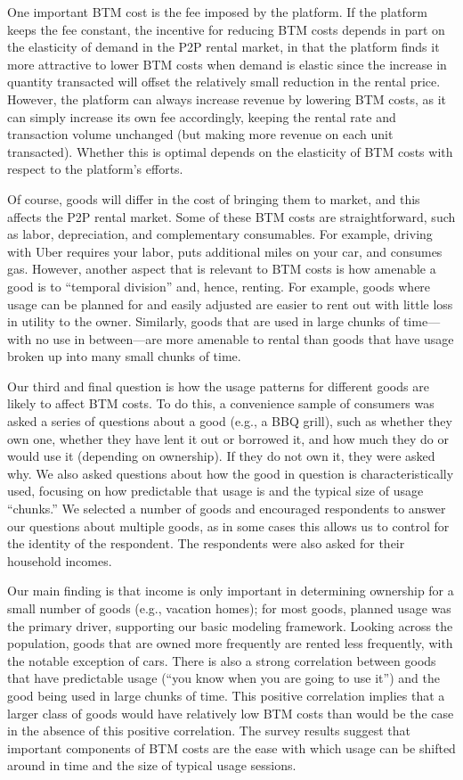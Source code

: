 \documentclass[11pt]{article}
\begin{document}
One important BTM cost is the fee imposed by the platform.
If the platform keeps the fee constant, the incentive for reducing BTM costs depends in part on the elasticity of demand in the P2P rental market, in that the platform finds it more attractive to lower BTM costs when demand is elastic since the increase in quantity transacted will offset the relatively small reduction in the rental price.
However, the platform can always increase revenue by lowering BTM costs, as it can simply increase its own fee accordingly, keeping the rental rate and transaction volume unchanged (but making more revenue on each unit transacted).
Whether this is optimal depends on the elasticity of BTM costs with respect to the platform's efforts. 

Of course, goods will differ in the cost of bringing them to market, and this affects the P2P rental market. 
Some of these BTM costs are straightforward, such as labor, depreciation, and complementary consumables.
For example, driving with Uber requires your labor, puts additional miles on your car, and consumes gas.
However, another aspect that is relevant to BTM costs is how amenable a good is to ``temporal division'' and, hence, renting.
For example, goods where usage can be planned for and easily adjusted are easier to rent out with little loss in utility to the owner. 
Similarly, goods that are used in large chunks of time---with no use in between---are more amenable to rental than goods that have usage broken up into many small chunks of time.

Our third and final question is how the usage patterns for different goods are likely to affect BTM costs.
To do this, a convenience sample of consumers was asked a series of questions about a good (e.g., a BBQ grill), such as whether they own one, whether they have lent it out or borrowed it, and how much they do or would use it (depending on ownership). 
If they do not own it, they were asked why. 
We also asked questions about how the good in question is characteristically used, focusing on how predictable that usage is and the typical size of usage ``chunks.''  
We selected a number of goods and encouraged respondents to answer our questions about multiple goods, as in some cases this allows us to control for the identity of the respondent. 
The respondents were also asked for their household incomes.

Our main finding is that income is only important in determining ownership for a small number of goods (e.g., vacation homes); 
for most goods, planned usage was the primary driver, supporting our basic modeling framework.  
Looking across the population, goods that are owned more frequently are rented less frequently, with the notable exception of cars.
There is also a strong correlation between goods that have predictable usage (``you know when you are going to use it'') and the good being used in large chunks of time.
This positive correlation implies that a larger class of goods would have relatively low BTM costs than would be the case in the absence of this positive correlation. 
The survey results suggest that important components of BTM costs are the ease with which usage can be shifted around in time and the size of typical usage sessions.
\end{document}
